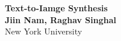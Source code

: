 \documentclass[a0,portrait]{a0poster}
\begin{document}


\begin{minipage}[b]{0.75\linewidth}
\VeryHuge \color{NavyBlue} \textbf{Text-to-Iamge Synthesis} \color{Black}\\ %
\huge \textbf{Jiin Nam, Raghav Singhal}\\[0.5cm] %
\huge New York University\\[0.4cm] %
\end{minipage}
%

\vspace{1cm} %

\end{document}
